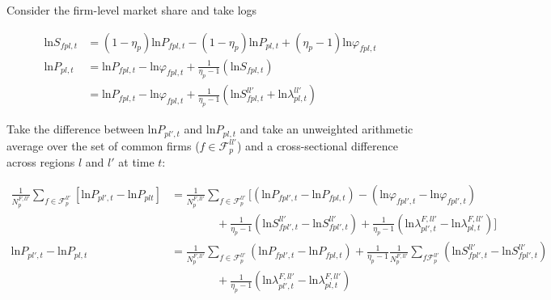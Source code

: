 \noindent Consider the firm-level market share and take logs
\begin{linenomath*}    
\begin{equation*}
    \begin{aligned}
        \text{ln} S_{fpl,t} 
            &=  \left(1-\eta_p\right) \text{ln}P_{fpl,t} - \left(1-\eta_p\right) \text{ln}P_{pl,t} + 
                \left(\eta_p-1\right)\text{ln} \varphi_{fpl,t} \\
        \text{ln} P_{pl,t} 
            &=  \text{ln}P_{fpl,t} - \text{ln} \varphi_{fpl,t} + 
                \frac{1}{\eta_p-1}\left(\text{ln} S_{fpl,t}\right) \\
            &=  \text{ln}P_{fpl,t} - \text{ln} \varphi_{fpl,t} + 
                \frac{1}{\eta_p-1}
                \left(\text{ln} S^{ll'}_{fpl,t} + \text{ln} \lambda^{ll'}_{pl,t}\right)
    \end{aligned}
\end{equation*}
\end{linenomath*}    

\noindent Take the difference between $\text{ln} P_{pl',t}$ and $\text{ln} P_{pl,t}$ and take an unweighted arithmetic average over the set of common firms ($f \in \mathcal{F}^{ll'}_{p}$) and a cross-sectional difference across regions $l$ and $l'$ at time $t$:
\begin{linenomath*}    
\begin{equation*}
    \begin{aligned}
        \frac{1}{N^{F,ll'}_{p}} \sum_{f \in \mathcal{F}^{ll'}_{p}} 
            \left[\text{ln}P_{pl',t} - \text{ln} P_{plt}\right] 
            &=  \frac{1}{N^{F,ll'}_{p}} \sum_{f \in \mathcal{F}^{ll'}_{p}} 
                \Bigg[ 
                    \left(\text{ln}P_{fpl',t} - \text{ln}P_{fpl,t} \right) 
                    - \left(\text{ln}\varphi_{fpl',t} - \text{ln}\varphi_{fpl',t} \right) \\
                    & \qquad \qquad 
                    + \frac{1}{\eta_p-1}
                        \left(\text{ln}S^{ll'}_{fpl',t} - \text{ln}S^{ll'}_{fpl',t} \right)
                    + \frac{1}{\eta_p-1}
                        \left(\text{ln} \lambda^{F,ll'}_{pl',t} - \text{ln}\lambda^{F,ll'}_{pl,t} \right)
                \Bigg] \\
        \text{ln}P_{pl',t} - \text{ln} P_{pl,t} 
            &=  \frac{1}{N^{F,ll'}_{p}} \sum_{f \in \mathcal{F}^{ll'}_{p}} 
                    \left(\text{ln}P_{fpl',t} - \text{ln}P_{fpl,t} \right) 
                + \frac{1}{\eta_p-1} 
                    \frac{1}{N^{F,ll'}_{p}} \sum_{f \mathcal{F}^{ll'}_{p}} 
                    \left(\text{ln}S^{ll'}_{fpl',t} - \text{ln}S^{ll'}_{fpl',t} \right) \\
                & \qquad \qquad 
                + \frac{1}{\eta_p-1} 
                    \left(\text{ln} \lambda^{F,ll'}_{pl',t} - \text{ln}\lambda^{F,ll'}_{pl,t} \right)
    \end{aligned}
\end{equation*}
\end{linenomath*}    

